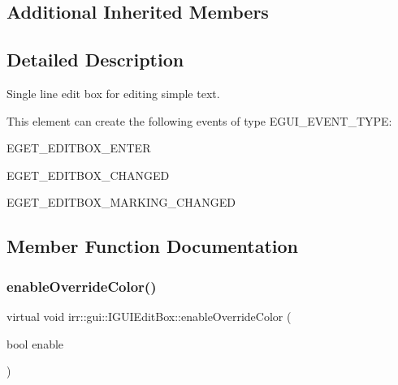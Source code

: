 \subsection*{Additional Inherited Members}


\subsection{Detailed Description}
Single line edit box for editing simple text. 

\begin{DoxyParagraph}{This element can create the following events of type E\+G\+U\+I\+\_\+\+E\+V\+E\+N\+T\+\_\+\+T\+Y\+PE\+:}
\begin{DoxyItemize}
\item E\+G\+E\+T\+\_\+\+E\+D\+I\+T\+B\+O\+X\+\_\+\+E\+N\+T\+ER \item E\+G\+E\+T\+\_\+\+E\+D\+I\+T\+B\+O\+X\+\_\+\+C\+H\+A\+N\+G\+ED \item E\+G\+E\+T\+\_\+\+E\+D\+I\+T\+B\+O\+X\+\_\+\+M\+A\+R\+K\+I\+N\+G\+\_\+\+C\+H\+A\+N\+G\+ED \end{DoxyItemize}

\end{DoxyParagraph}


\subsection{Member Function Documentation}
\mbox{\label{classirr_1_1gui_1_1IGUIEditBox_a121ab76cb2b69bbc4238921095917346}} 
\subsubsection{\texorpdfstring{enable\+Override\+Color()}{enableOverrideColor()}\hspace{0.1cm}{\footnotesize\ttfamily [1/2]}}
{\footnotesize\ttfamily virtual void irr\+::gui\+::\+I\+G\+U\+I\+Edit\+Box\+::enable\+Override\+Color (\begin{DoxyParamCaption}\item[{bool}]{enable }\end{DoxyParamCaption})\hspace{0.3cm}{\ttfamily [pure virtual]}}



